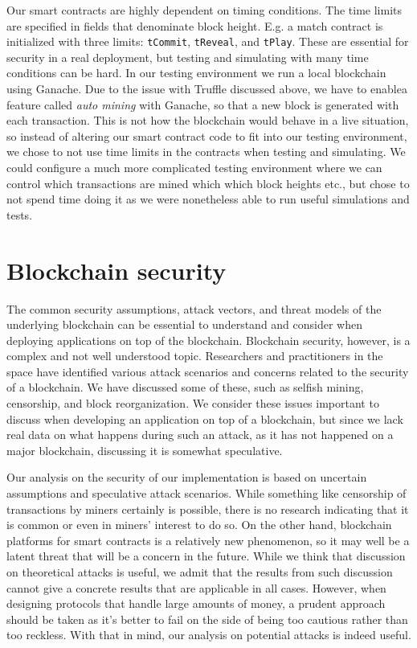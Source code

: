 Our smart contracts are highly dependent on timing conditions. The time limits are specified in fields that denominate block height. E.g. a match contract is initialized with three limits: \texttt{tCommit}, \texttt{tReveal}, and \texttt{tPlay}. These are essential for security in a real deployment, but testing and simulating with many time conditions can be hard. In our testing environment we run a local blockchain using Ganache. Due to the issue with Truffle discussed above, we have to enablea feature called \emph{auto mining} with Ganache, so that a new block is generated with each transaction. This is not how the blockchain would behave in a live situation, so instead of altering our smart contract code to fit into our testing environment, we chose to not use time limits in the contracts when testing and simulating. We could configure a much more complicated testing environment where we can control which transactions are mined which which block heights etc., but chose to not spend time doing it as we were nonetheless able to run useful simulations and tests. 

\section{Blockchain security}
\label{sec:discussion-security}

The common security assumptions, attack vectors, and threat models of the underlying blockchain can be essential to understand and consider when deploying applications on top of the blockchain. Blockchain security, however, is a complex and not well understood topic. Researchers and practitioners in the space have identified various attack scenarios and concerns related to the security of a blockchain. We have discussed some of these, such as selfish mining, censorship, and block reorganization. We consider these issues important to discuss when developing an application on top of a blockchain, but since we lack real data on what happens during such an attack, as it has not happened on a major blockchain, discussing it is somewhat speculative.

Our analysis on the security of our implementation is based on uncertain assumptions and speculative attack scenarios. While something like censorship of transactions by miners certainly is possible, there is no research indicating that it is common or even in miners' interest to do so. On the other hand, blockchain platforms for smart contracts is a relatively new phenomenon, so it may well be a latent threat that will be a concern in the future. While we think that discussion on theoretical attacks is useful, we admit that the results from such discussion cannot give a concrete results that are applicable in all cases. However, when designing protocols that handle large amounts of money, a prudent approach should be taken as it's better to fail on the side of being too cautious rather than too reckless. With that in mind, our analysis on potential attacks is indeed useful. 


